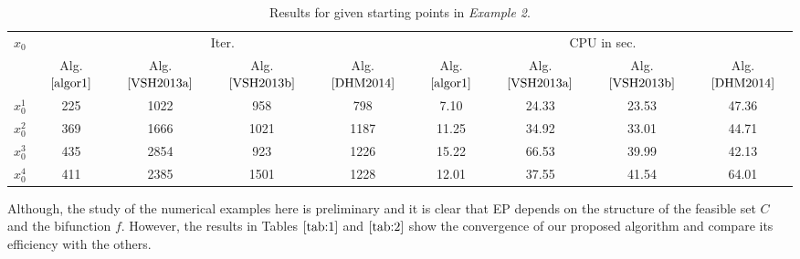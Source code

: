 \documentclass{aims}
\theoremstyle{definition}
\begin{document}
\begin{table}[ht]\caption{Results for given starting points in \textit{Example 2}.}\label{tab:2}
\medskip\begin{center}
\begin{tabular}{|c|c|c|c|c|c|c|c|c|}
\hline
 $x_0$&\multicolumn{4}{c|}{Iter.} &\multicolumn{4}{c|}{CPU in sec.}
\\ \cline{2-9}
  &Alg. $\ref{algor1}$ &Alg. $\ref{VSH2013a}$&Alg. $\ref{VSH2013b}$&Alg. $\ref{DHM2014}$& Alg. $\ref{algor1}$ &Alg. $\ref{VSH2013a}$&Alg. $\ref{VSH2013b}$&Alg. $\ref{DHM2014}$ \\ \hline
$x_0^1$&225&1022&958&798 &7.10&24.33&23.53&47.36 \\ \hline
$x_0^2$&369&1666&1021&1187&11.25 &34.92&33.01&44.71 \\ \hline
$x_0^3$&435&2854&923&1226&15.22 &66.53&39.99&42.13 \\ \hline
$x_0^4$&411&2385&1501&1228&12.01&37.55&41.54 &64.01 \\ \hline
 \end{tabular}
\end{center}
\end{table}
Although, the study of the numerical examples here is preliminary and it is clear that EP depends on the structure of the feasible set $C$ and the bifunction $f$. 
However, the results in Tables $\ref{tab:1}$ and $\ref{tab:2}$ show the convergence of our proposed algorithm and compare its efficiency with the others.
\end{document}
